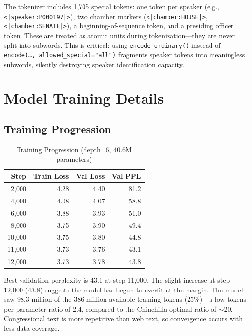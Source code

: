 \documentclass[12pt]{article}
\begin{document}
The tokenizer includes 1,705 special tokens: one token per speaker (e.g., \texttt{<|speaker:\allowbreak{}P000197|>}), two chamber markers (\texttt{<|chamber:\allowbreak{}HOUSE|>}, \texttt{<|chamber:\allowbreak{}SENATE|>}), a beginning-of-sequence token, and a presiding officer token. These are treated as atomic units during tokenization---they are never split into subwords. This is critical: using \texttt{encode\_ordinary()} instead of \texttt{encode(\ldots, allowed\_special=\allowbreak{}"all")} fragments speaker tokens into meaningless subwords, silently destroying speaker identification capacity.


\section{Model Training Details}
\label{app:training}

\subsection{Training Progression}

\begin{table}[H]
\centering
\caption{Training Progression (depth=6, 40.6M parameters)}
\label{tab:training}
\begin{tabular}{rrrr}
\toprule
Step & Train Loss & Val Loss & Val PPL \\
\midrule
2,000 & 4.28 & 4.40 & 81.2 \\
4,000 & 4.08 & 4.07 & 58.8 \\
6,000 & 3.88 & 3.93 & 51.0 \\
8,000 & 3.75 & 3.90 & 49.4 \\
10,000 & 3.75 & 3.80 & 44.8 \\
11,000 & 3.73 & 3.76 & 43.1 \\
12,000 & 3.73 & 3.78 & 43.8 \\
\bottomrule
\end{tabular}
\end{table}

Best validation perplexity is 43.1 at step 11,000. The slight increase at step 12,000 (43.8) suggests the model has begun to overfit at the margin. The model saw 98.3 million of the 386 million available training tokens (25\%)---a low tokens-per-parameter ratio of 2.4, compared to the Chinchilla-optimal ratio of $\sim$20. Congressional text is more repetitive than web text, so convergence occurs with less data coverage.
\end{document}
